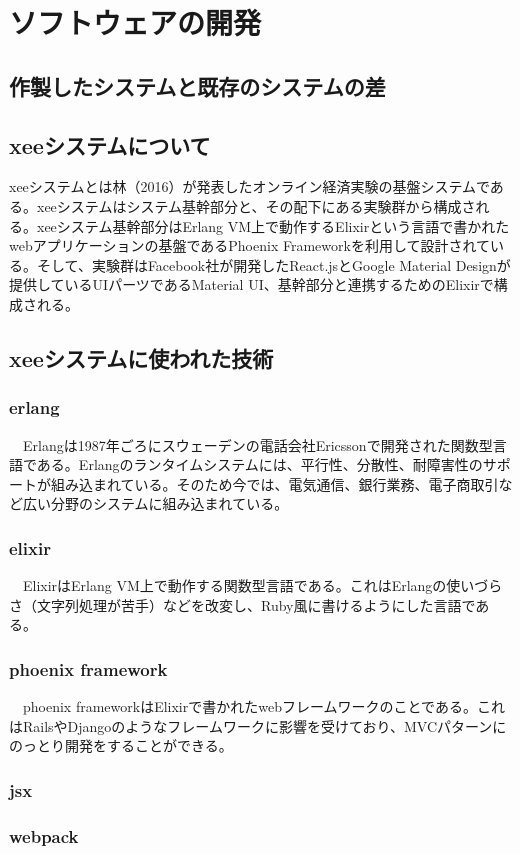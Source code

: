 \documentclass[11pt,a4paper]{jsarticle}
\begin{document}
\section{ソフトウェアの開発}
\subsection{作製したシステムと既存のシステムの差}
\subsection{xeeシステムについて}
xeeシステムとは林（2016）が発表したオンライン経済実験の基盤システムである。xeeシステムはシステム基幹部分と、その配下にある実験群から構成される。xeeシステム基幹部分はErlang VM上で動作するElixirという言語で書かれたwebアプリケーションの基盤であるPhoenix Frameworkを利用して設計されている。そして、実験群はFacebook社が開発したReact.jsとGoogle Material Designが提供しているUIパーツであるMaterial UI、基幹部分と連携するためのElixirで構成される。
\subsection{xeeシステムに使われた技術}
\subsubsection{erlang}
　Erlangは1987年ごろにスウェーデンの電話会社Ericssonで開発された関数型言語である。Erlangのランタイムシステムには、平行性、分散性、耐障害性のサポートが組み込まれている。そのため今では、電気通信、銀行業務、電子商取引など広い分野のシステムに組み込まれている。
\subsubsection{elixir}
　ElixirはErlang VM上で動作する関数型言語である。これはErlangの使いづらさ（文字列処理が苦手）などを改変し、Ruby風に書けるようにした言語である。
\subsubsection{phoenix framework}
　phoenix frameworkはElixirで書かれたwebフレームワークのことである。これはRailsやDjangoのようなフレームワークに影響を受けており、MVCパターンにのっとり開発をすることができる。
\subsubsection{jsx}
\subsubsection{webpack}
\end{document}
